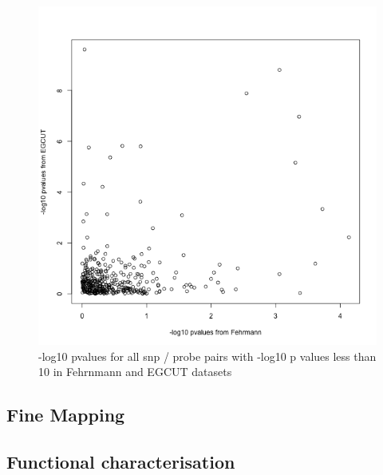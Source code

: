\documentclass[paper=a4, fontsize=11pt]{scrartcl}	%
\numberwithin{equation}{section}									%
\numberwithin{figure}{section}										%
\numberwithin{table}{section}										%
\begin{document}
\begin{figure}[p]
	\centering
	\includegraphics[width=15cm]{images/EGCUT_vs_Fehrmann_pval10}
	\caption{-log10 pvalues for all snp / probe pairs with -log10 p values less than 10 in Fehrnmann and EGCUT datasets}
	\label{fig:repl_match10}
\end{figure}




\subsection{Fine Mapping}

\subsection{Functional characterisation}


\clearpage




\end{document}
